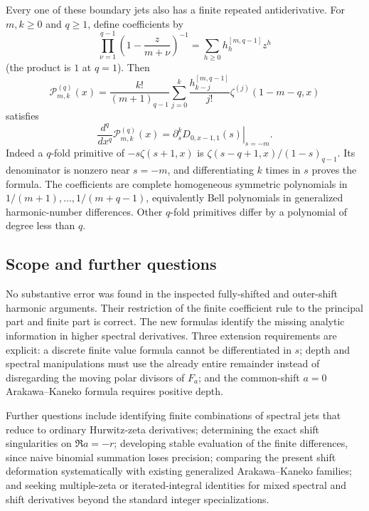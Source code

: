 \documentclass[11pt,a4paper]{article}
\numberwithin{equation}{section}
\theoremstyle{definition}
\theoremstyle{remark}
\begin{document}
Every one of these boundary jets also has a finite repeated
antiderivative. For $m,k\ge0$ and $q\ge1$, define coefficients by
\[
 \prod_{\nu=1}^{q-1}\left(1-\frac z{m+\nu}\right)^{-1}
     =\sum_{h\ge0}h_h^{[m,q-1]}z^h
\]
(the product is $1$ at $q=1$). Then
\begin{equation}\label{hn:eq:boundary-primitives}
 \mathcal P_{m,k}^{(q)}(x)=\frac{k!}{(m+1)_{q-1}}
       \sum_{j=0}^k\frac{h_{k-j}^{[m,q-1]}}{j!}
                    \zeta^{(j)}(1-m-q,x)
\end{equation}
satisfies
\[
 \frac{d^q}{dx^q}\mathcal P_{m,k}^{(q)}(x)
       =\left.\partial_s^kD_{0,x-1,1}(s)\right|_{s=-m}.
\]
Indeed a $q$-fold primitive of $-s\zeta(s+1,x)$ is
$\zeta(s-q+1,x)/(1-s)_{q-1}$. Its denominator is nonzero near
$s=-m$, and differentiating $k$ times in $s$ proves the formula.
The coefficients are complete homogeneous symmetric polynomials
in $1/(m+1),\ldots,1/(m+q-1)$, equivalently Bell polynomials in
generalized harmonic-number differences. Other $q$-fold
primitives differ by a polynomial of degree less than $q$.

\subsection{Scope and further questions}

No substantive error was found in the inspected fully-shifted
and outer-shift harmonic arguments. Their restriction of the
finite coefficient rule to the principal part and finite part
is correct. The new formulas identify the missing analytic
information in higher spectral derivatives. Three extension
requirements are explicit: a discrete finite value formula
cannot be differentiated in $s$; depth and spectral manipulations
must use the already entire remainder instead of disregarding
the moving polar divisors of $F_a$; and the common-shift $a=0$
Arakawa--Kaneko formula requires positive depth.

Further questions include identifying finite combinations of
spectral jets that reduce to ordinary Hurwitz-zeta derivatives;
determining the exact shift singularities on $\Re a=-r$;
developing stable evaluation of the finite differences, since
naive binomial summation loses precision; comparing the present
shift deformation systematically with existing generalized
Arakawa--Kaneko families; and seeking multiple-zeta or
iterated-integral identities for mixed spectral and shift
derivatives beyond the standard integer specializations.


\clearpage
\end{document}
